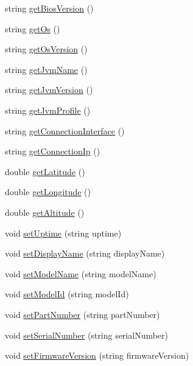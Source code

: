 \begin{DoxyCompactItemize}
string \hyperlink{class_edc_device_profile_a3e2ae477ba8229b130501b3acc3230dd}{get\-Bios\-Version} ()
\item 
string \hyperlink{class_edc_device_profile_a59b47101416e034faf4ed4bf1068d670}{get\-Os} ()
\item 
string \hyperlink{class_edc_device_profile_a751c249efc72edb1464048d8ee548aa5}{get\-Os\-Version} ()
\item 
string \hyperlink{class_edc_device_profile_a6ddbb3f99b19ecaa8a4bfa4f84b4f1b9}{get\-Jvm\-Name} ()
\item 
string \hyperlink{class_edc_device_profile_a469f99a49b9c72ec0cac36d21408812a}{get\-Jvm\-Version} ()
\item 
string \hyperlink{class_edc_device_profile_a1d549b4b57e8179262e127e491ceb768}{get\-Jvm\-Profile} ()
\item 
string \hyperlink{class_edc_device_profile_a60cb7f57f1bf7580523a05a32358f75a}{get\-Connection\-Interface} ()
\item 
string \hyperlink{class_edc_device_profile_a8aca1d27c45d7beba90938b75d22fea7}{get\-Connection\-Ip} ()
\item 
double \hyperlink{class_edc_device_profile_a38c4c62a4be5cd3a737bdb81024a4f6b}{get\-Latitude} ()
\item 
double \hyperlink{class_edc_device_profile_a94d0e769e671d18952600e7f3a3a3c59}{get\-Longitude} ()
\item 
double \hyperlink{class_edc_device_profile_abd2f64f782b5e5c0a66572f84bdfd1cd}{get\-Altitude} ()
\item 
void \hyperlink{class_edc_device_profile_af88e053451c04eba3db015b544e97e8c}{set\-Uptime} (string uptime)
\item 
void \hyperlink{class_edc_device_profile_aed6168a4c066e68467cb1f3ea78cedd9}{set\-Display\-Name} (string display\-Name)
\item 
void \hyperlink{class_edc_device_profile_a45343317c2b3320189647b43259e4943}{set\-Model\-Name} (string model\-Name)
\item 
void \hyperlink{class_edc_device_profile_aabcfbb8822b427c668ea92235333faad}{set\-Model\-Id} (string model\-Id)
\item 
void \hyperlink{class_edc_device_profile_ac6ea2b2b13dc0486c39ce42c381cdde0}{set\-Part\-Number} (string part\-Number)
\item 
void \hyperlink{class_edc_device_profile_a9555615ad2d794415d9277fbd9467ef9}{set\-Serial\-Number} (string serial\-Number)
\item 
void \hyperlink{class_edc_device_profile_a4fd4149be3ed22903d34ca32c2bc95d7}{set\-Firmware\-Version} (string firmware\-Version)

\end{DoxyCompactItemize}
